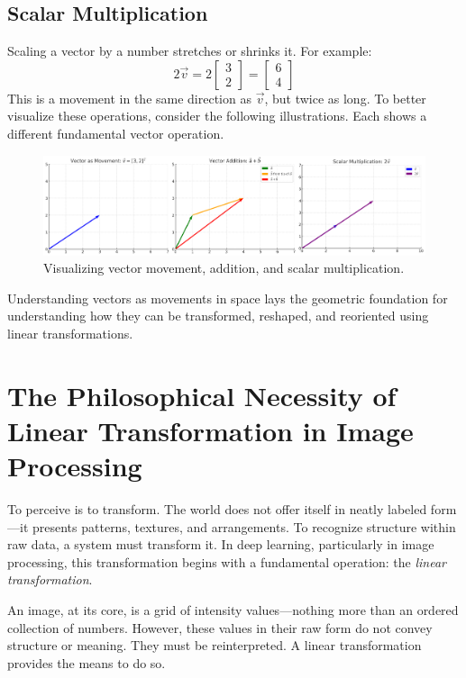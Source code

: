 \subsection*{Scalar Multiplication}
Scaling a vector by a number stretches or shrinks it. For example:
\[
2 \vec{v} = 2 \begin{bmatrix} 3 \\ 2 \end{bmatrix} = \begin{bmatrix} 6 \\ 4 \end{bmatrix}
\]
This is a movement in the same direction as \( \vec{v} \), but twice as long. To better visualize these operations, consider the following illustrations. Each shows a different fundamental vector operation.


\begin{figure}[h!]
	\centering
	\includegraphics[width=\textwidth]{figures/vector_addition_multiplication.png}
	\caption{Visualizing vector movement, addition, and scalar multiplication.}
	\label{fig:vector_basics}
\end{figure}

Understanding vectors as movements in space lays the geometric foundation for understanding how they can be transformed, reshaped, and reoriented using linear transformations.

\section{The Philosophical Necessity of Linear Transformation in Image Processing}

To perceive is to transform. The world does not offer itself in neatly labeled form—it presents patterns, textures, and arrangements. To recognize structure within raw data, a system must transform it. In deep learning, particularly in image processing, this transformation begins with a fundamental operation: the \textit{linear transformation}.

An image, at its core, is a grid of intensity values—nothing more than an ordered collection of numbers. However, these values in their raw form do not convey structure or meaning. They must be reinterpreted. A linear transformation provides the means to do so.

